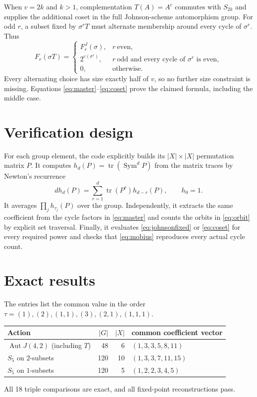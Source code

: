 \documentclass[11pt]{article}
\newcommand{\Sym}{\operatorname{Sym}}
\newcommand{\Aut}{\operatorname{Aut}}
\begin{document}
When $v=2k$ and $k>1$, complementation $T(A)=A^c$ commutes with $S_{2k}$
and supplies the additional coset in the full Johnson-scheme automorphism
group.  For odd $r$, a subset fixed by $\sigma^rT$ must alternate membership
around every cycle of $\sigma^r$.  Thus
\begin{equation}\label{eq:coset}
F_r(\sigma T)=\begin{cases}
F_r^J(\sigma),&r\ \text{even},\\
2^{c(\sigma^r)},&r\ \text{odd and every cycle of $\sigma^r$ is even},\\
0,&\text{otherwise}.
\end{cases}
\end{equation}
Every alternating choice has size exactly half of $v$, so no further size
constraint is missing.  Equations \eqref{eq:master}--\eqref{eq:coset} prove
the claimed formula, including the middle case.

\section{Verification design}
For each group element, the code explicitly builds its $|X|\times|X|$
permutation matrix $P$.  It computes $h_d(P)=\operatorname{tr}(\Sym^dP)$ from
the matrix traces by Newton's recurrence
\[
 d h_d(P)=\sum_{r=1}^d\operatorname{tr}(P^r)h_{d-r}(P),\qquad h_0=1.
\]
It averages $\prod_j h_{\tau_j}(P)$ over the group.  Independently, it
extracts the same coefficient from the cycle factors in \eqref{eq:master}
and counts the orbits in \eqref{eq:orbit} by explicit set traversal.  Finally,
it evaluates \eqref{eq:johnsonfixed} or \eqref{eq:coset} for every required
power and checks that \eqref{eq:mobius} reproduces every actual cycle count.

\section{Exact results}
The entries list the common value in the order
$\tau=(1),(2),(1,1),(3),(2,1),(1,1,1)$.
\begin{center}
\begin{tabular}{@{}lrrl@{}}
\toprule
Action & $|G|$ & $|X|$ & common coefficient vector\\
\midrule
$\Aut J(4,2)$ (including $T$) & 48 & 6 & $(1,3,3,5,8,11)$\\
$S_5$ on $2$-subsets & 120 & 10 & $(1,3,3,7,11,15)$\\
$S_5$ on $1$-subsets & 120 & 5 & $(1,2,2,3,4,5)$\\
\bottomrule
\end{tabular}
\end{center}
All 18 triple comparisons are exact, and all fixed-point reconstructions pass.
\end{document}
